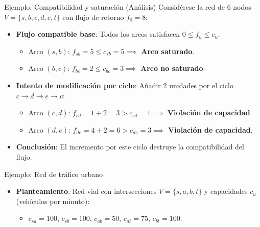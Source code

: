 \documentclass[
  ignorenonframetext,
]{beamer}
\providecommand{\tightlist}{%
  \setlength{\itemsep}{0pt}\setlength{\parskip}{0pt}}
\begin{document}
\begin{frame}{Ejemplo: Compatibilidad y saturación (Análisis)}
\label{ejemplo-compatibilidad-y-saturaciuxf3n-anuxe1lisis}
Considérese la red de 6 nodos \(V = \{s, b, c, d, e, t\}\) con flujo de
retorno \(f_0 = 8\):

\begin{itemize}
\tightlist
\item
  \textbf{Flujo compatible base}: Todos los arcos satisfacen
  \(0 \le f_u \le c_u\).

  \begin{itemize}
  \tightlist
  \item
    Arco \((s, b)\): \(f_{sb} = 5 \le c_{sb} = 5 \implies\) \textbf{Arco
    saturado}.
  \item
    Arco \((b, c)\): \(f_{bc} = 2 \le c_{bc} = 3 \implies\) \textbf{Arco
    no saturado}.
  \end{itemize}
\item
  \textbf{Intento de modificación por ciclo}: Añadir 2 unidades por el
  ciclo \(c \to d \to e \to c\):

  \begin{itemize}
  \tightlist
  \item
    Arco \((c, d)\): \(f_{cd} = 1 + 2 = 3 > c_{cd} = 1 \implies\)
    \textbf{Violación de capacidad}.
  \item
    Arco \((d, e)\): \(f_{de} = 4 + 2 = 6 > c_{de} = 3 \implies\)
    \textbf{Violación de capacidad}.
  \end{itemize}
\item
  \textbf{Conclusión}: El incremento por este ciclo destruye la
  compatibilidad del flujo.
\end{itemize}
\end{frame}

\begin{frame}{Ejemplo: Red de tráfico urbano}
\label{ejemplo-red-de-truxe1fico-urbano}
\begin{itemize}
\tightlist
\item
  \textbf{Planteamiento}: Red vial con intersecciones
  \(V = \{s, a, b, t\}\) y capacidades \(c_u\) (vehículos por minuto):

  \begin{itemize}
  \tightlist
  \item
    \(c_{sa} = 100\), \(c_{sb} = 100\), \(c_{ab} = 50\),
    \(c_{at} = 75\), \(c_{bt} = 100\).
  \end{itemize}
\end{itemize}
\end{frame}
\end{document}
